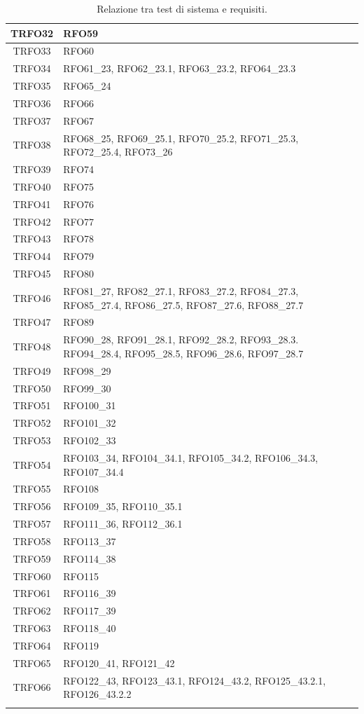 \begin{longtable}{|c| C{13cm}|}
	TRFO32 & RFO59\\ \hline
	TRFO33 & RFO60\\ \hline
	TRFO34 & RFO61\_23, RFO62\_23.1, RFO63\_23.2, RFO64\_23.3\\ \hline
	TRFO35 & RFO65\_24\\ \hline
	TRFO36 & RFO66\\ \hline
	TRFO37 & RFO67\\ \hline
	TRFO38 & RFO68\_25, RFO69\_25.1, RFO70\_25.2, RFO71\_25.3, RFO72\_25.4, RFO73\_26\\ \hline
	TRFO39 & RFO74\\ \hline
	TRFO40 & RFO75\\ \hline
	TRFO41 & RFO76\\ \hline
	TRFO42 & RFO77\\ \hline
	TRFO43 & RFO78\\ \hline
	TRFO44 & RFO79\\ \hline
	TRFO45 & RFO80\\ \hline
	TRFO46 & RFO81\_27, RFO82\_27.1, RFO83\_27.2, RFO84\_27.3, RFO85\_27.4, RFO86\_27.5, RFO87\_27.6, RFO88\_27.7\\ \hline
	TRFO47 & RFO89\\ \hline
	TRFO48 & RFO90\_28, RFO91\_28.1, RFO92\_28.2, RFO93\_28.3. RFO94\_28.4, RFO95\_28.5, RFO96\_28.6, RFO97\_28.7\\ \hline
	TRFO49 & RFO98\_29\\ \hline
	TRFO50 & RFO99\_30\\ \hline
	TRFO51 & RFO100\_31\\ \hline
	TRFO52 & RFO101\_32\\ \hline
	TRFO53 & RFO102\_33\\ \hline
	TRFO54 & RFO103\_34, RFO104\_34.1, RFO105\_34.2, RFO106\_34.3, RFO107\_34.4\\ \hline
	TRFO55 & RFO108\\ \hline
	TRFO56 & RFO109\_35, RFO110\_35.1\\ \hline
	TRFO57 & RFO111\_36, RFO112\_36.1\\ \hline
	TRFO58 & RFO113\_37\\ \hline
	TRFO59 & RFO114\_38\\ \hline
	TRFO60 & RFO115\\ \hline
	TRFO61 & RFO116\_39\\ \hline
	TRFO62 & RFO117\_39\\ \hline
	TRFO63 & RFO118\_40\\ \hline
	TRFO64 & RFO119\\ \hline
	TRFO65 & RFO120\_41, RFO121\_42\\ \hline
	TRFO66 & RFO122\_43, RFO123\_43.1, RFO124\_43.2, RFO125\_43.2.1, RFO126\_43.2.2\\ 
	\caption{Relazione tra test di sistema e requisiti.}\\
\end{longtable}
\newpage
